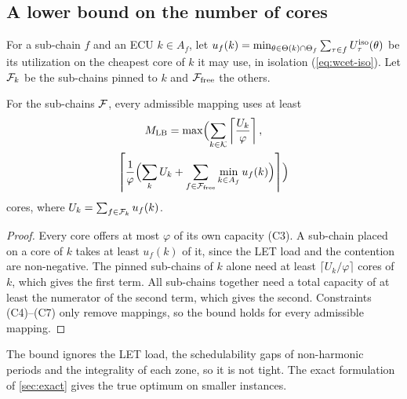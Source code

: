 \subsection{A lower bound on the number of cores}
\label{sec:lower-bound}

For a sub-chain $f$ and an ECU $k\in A_f$, let $u_f(k)=\min_{\theta\in
\Theta(k)\cap\Theta_f}\sum_{\tau\in f}U^{\mathrm{iso}}_\tau(\theta)$ be its
utilization on the cheapest core of $k$ it may use, in isolation
(\cref{eq:wcet-iso}). Let $\mathcal{F}_k$ be the sub-chains pinned to $k$ and
$\mathcal{F}_{\mathrm{free}}$ the others.

\begin{proposition}
\label{prop:lb}
For the sub-chains $\mathcal{F}$, every admissible mapping uses at least
\begin{multline}
M_{\mathrm{LB}}=\max\Bigl(\sum_{k\in\mathcal{K}}\left\lceil \frac{U_k}{\varphi} \right\rceil,\\
\left\lceil \frac{1}{\varphi}\Bigl(\sum_kU_k+\sum_{f\in\mathcal{F}_{\mathrm{free}}}
\min_{k\in A_f}u_f(k)\Bigr) \right\rceil\Bigr)
\label{eq:lb}
\end{multline}
cores, where $U_k=\sum_{f\in\mathcal{F}_k}u_f(k)$.
\end{proposition}
\begin{proof}
Every core offers at most $\varphi$ of its own capacity (C3). A sub-chain
placed on a core of $k$ takes at least $u_f(k)$ of it, since the LET load
and the contention are non-negative. The pinned sub-chains of $k$ alone
need at least $\lceil U_k/\varphi\rceil$ cores of $k$, which gives the first
term. All sub-chains together need a total capacity of at least the
numerator of the second term, which gives the second. Constraints
(C4)--(C7) only remove mappings, so the bound holds for every admissible
mapping.
\end{proof}
The bound ignores the LET load, the schedulability gaps of non-harmonic
periods and the integrality of each zone, so it is not tight. The exact
formulation of \cref{sec:exact} gives the true optimum on smaller
instances.
